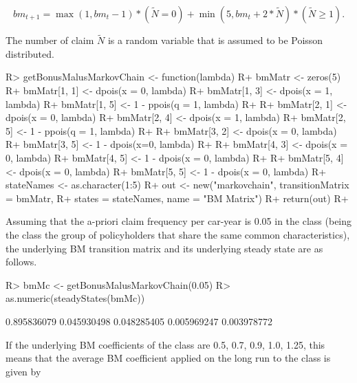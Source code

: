 \documentclass[
  nojss]{jss}
\begin{document}
\begin{equation}
bm_{t + 1} = \max \left( {1,bm_{t} - 1} \right)*\left( {\tilde N = 0} \right) + \min \left( {5,bm_{t} + 2*\tilde N} \right)*\left( {\tilde N \ge 1} \right).
\label{eq:BM}
\end{equation}

The number of claim \(\tilde N\) is a random variable that is assumed
to be Poisson distributed.

\begin{CodeChunk}

\begin{CodeInput}
R> getBonusMalusMarkovChain <- function(lambda) {
R+  bmMatr <- zeros(5)
R+  bmMatr[1, 1] <- dpois(x = 0, lambda)
R+  bmMatr[1, 3] <- dpois(x = 1, lambda)
R+  bmMatr[1, 5] <- 1 - ppois(q = 1, lambda)
R+  
R+  bmMatr[2, 1] <- dpois(x = 0, lambda)
R+  bmMatr[2, 4] <- dpois(x = 1, lambda)
R+  bmMatr[2, 5] <- 1 - ppois(q = 1, lambda)
R+  
R+  bmMatr[3, 2] <- dpois(x = 0, lambda)
R+  bmMatr[3, 5] <- 1 - dpois(x=0, lambda)
R+  
R+  bmMatr[4, 3] <- dpois(x = 0, lambda)
R+  bmMatr[4, 5] <- 1 - dpois(x = 0, lambda)
R+   
R+  bmMatr[5, 4] <- dpois(x = 0, lambda)
R+  bmMatr[5, 5] <- 1 - dpois(x = 0, lambda)
R+  stateNames <- as.character(1:5)
R+  out <- new("markovchain", transitionMatrix = bmMatr, 
R+              states = stateNames, name = "BM Matrix")
R+  return(out)
R+ }
\end{CodeInput}
\end{CodeChunk}

Assuming that the a-priori claim frequency per car-year is 0.05 in the class (being the class the group of policyholders that share the same common characteristics), the underlying BM transition matrix and its underlying steady state are as follows.

\begin{CodeChunk}

\begin{CodeInput}
R> bmMc <- getBonusMalusMarkovChain(0.05)
R> as.numeric(steadyStates(bmMc))
\end{CodeInput}

\begin{CodeOutput}
[1] 0.895836079 0.045930498 0.048285405 0.005969247 0.003978772
\end{CodeOutput}
\end{CodeChunk}

If the underlying BM coefficients of the class are 0.5, 0.7, 0.9, 1.0, 1.25, this means that the average BM coefficient applied on the long run to the class is given by
\end{document}

